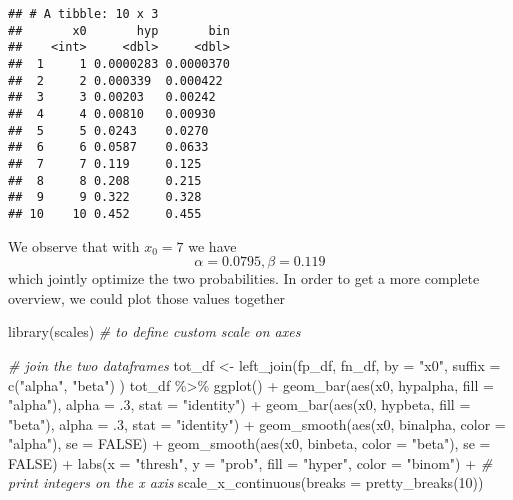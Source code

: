 \documentclass[
  oneside]{book}
\newenvironment{Shaded}{\begin{snugshade}}{\end{snugshade}}
\newcommand{\AttributeTok}[1]{\textcolor[rgb]{0.77,0.63,0.00}{#1}}
\newcommand{\CommentTok}[1]{\textcolor[rgb]{0.56,0.35,0.01}{\textit{#1}}}
\newcommand{\ConstantTok}[1]{\textcolor[rgb]{0.00,0.00,0.00}{#1}}
\newcommand{\DecValTok}[1]{\textcolor[rgb]{0.00,0.00,0.81}{#1}}
\newcommand{\FunctionTok}[1]{\textcolor[rgb]{0.00,0.00,0.00}{#1}}
\newcommand{\NormalTok}[1]{#1}
\newcommand{\OtherTok}[1]{\textcolor[rgb]{0.56,0.35,0.01}{#1}}
\newcommand{\SpecialCharTok}[1]{\textcolor[rgb]{0.00,0.00,0.00}{#1}}
\newcommand{\StringTok}[1]{\textcolor[rgb]{0.31,0.60,0.02}{#1}}
\begin{document}
\begin{verbatim}
## # A tibble: 10 x 3
##       x0       hyp       bin
##    <int>     <dbl>     <dbl>
##  1     1 0.0000283 0.0000370
##  2     2 0.000339  0.000422 
##  3     3 0.00203   0.00242  
##  4     4 0.00810   0.00930  
##  5     5 0.0243    0.0270   
##  6     6 0.0587    0.0633   
##  7     7 0.119     0.125    
##  8     8 0.208     0.215    
##  9     9 0.322     0.328    
## 10    10 0.452     0.455
\end{verbatim}

We observe that with \(x_0 = 7\) we have
\[
\alpha = 0.0795,  \beta = 0.119
\]
which jointly optimize the two probabilities.
In order to get a more complete overview, we could plot those values together

\begin{Shaded}
\begin{Highlighting}[]
\FunctionTok{library}\NormalTok{(scales) }\CommentTok{\# to define custom scale on axes}
\end{Highlighting}
\end{Shaded}

\begin{Shaded}
\begin{Highlighting}[]
\CommentTok{\# join the two dataframes}
\NormalTok{tot\_df }\OtherTok{\textless{}{-}} \FunctionTok{left\_join}\NormalTok{(fp\_df, fn\_df,}
  \AttributeTok{by =} \StringTok{"x0"}\NormalTok{, }\AttributeTok{suffix =} \FunctionTok{c}\NormalTok{(}\StringTok{"alpha"}\NormalTok{, }\StringTok{"beta"}\NormalTok{)}
\NormalTok{)}
\NormalTok{tot\_df }\SpecialCharTok{\%\textgreater{}\%}
  \FunctionTok{ggplot}\NormalTok{() }\SpecialCharTok{+}
  \FunctionTok{geom\_bar}\NormalTok{(}\FunctionTok{aes}\NormalTok{(x0, hypalpha, }\AttributeTok{fill =} \StringTok{"alpha"}\NormalTok{), }\AttributeTok{alpha =}\NormalTok{ .}\DecValTok{3}\NormalTok{, }\AttributeTok{stat =} \StringTok{"identity"}\NormalTok{) }\SpecialCharTok{+}
  \FunctionTok{geom\_bar}\NormalTok{(}\FunctionTok{aes}\NormalTok{(x0, hypbeta, }\AttributeTok{fill =} \StringTok{"beta"}\NormalTok{), }\AttributeTok{alpha =}\NormalTok{ .}\DecValTok{3}\NormalTok{, }\AttributeTok{stat =} \StringTok{"identity"}\NormalTok{) }\SpecialCharTok{+}
  \FunctionTok{geom\_smooth}\NormalTok{(}\FunctionTok{aes}\NormalTok{(x0, binalpha, }\AttributeTok{color =} \StringTok{"alpha"}\NormalTok{), }\AttributeTok{se =} \ConstantTok{FALSE}\NormalTok{) }\SpecialCharTok{+}
  \FunctionTok{geom\_smooth}\NormalTok{(}\FunctionTok{aes}\NormalTok{(x0, binbeta, }\AttributeTok{color =} \StringTok{"beta"}\NormalTok{), }\AttributeTok{se =} \ConstantTok{FALSE}\NormalTok{) }\SpecialCharTok{+}
  \FunctionTok{labs}\NormalTok{(}\AttributeTok{x =} \StringTok{"thresh"}\NormalTok{, }\AttributeTok{y =} \StringTok{"prob"}\NormalTok{, }\AttributeTok{fill =} \StringTok{"hyper"}\NormalTok{, }\AttributeTok{color =} \StringTok{"binom"}\NormalTok{) }\SpecialCharTok{+}
  \CommentTok{\# print integers on the x axis}
  \FunctionTok{scale\_x\_continuous}\NormalTok{(}\AttributeTok{breaks =} \FunctionTok{pretty\_breaks}\NormalTok{(}\DecValTok{10}\NormalTok{))}
\end{Highlighting}
\end{Shaded}
\end{document}
